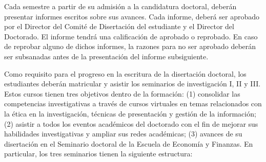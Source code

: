 Cada semestre a partir de su admisión a la candidatura doctoral, deberán presentar informes escritos sobre sus avances. Cada informe, deberá ser aprobado por el Director del Comité de Disertación del estudiante y el Director del Doctorado. El informe tendrá una calificación de aprobado o reprobado. En caso de reprobar alguno de dichos informes, la razones para no ser aprobado deberán ser subsanadas antes de la presentación del informe subsiguiente.

Como requisito para el progreso en la escritura de la disertación doctoral, los estudiantes deberán matricular y asistir los seminarios de investigación I, II y III. Estos cursos tienen tres objetivos dentro de la formación: (1) consolidar las competencias investigativas a través de cursos virtuales en temas relacionados con la ética en la investigación, técnicas de presentación y gestión de la información; (2) asistir a todos los eventos académicos del doctorado con el fin de mejorar sus habilidades investigativas y ampliar sus redes académicas; (3) avances de su disertación en el Seminario doctoral de la Escuela de Economía y Finanzas. En particular, los tres seminarios tienen la siguiente estructura:


